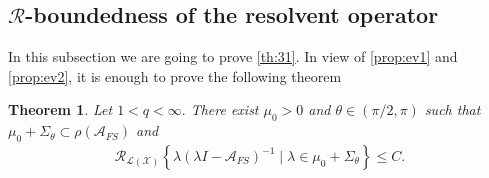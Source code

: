 \documentclass[12pt,a4paper,reqno]{amsart}
\newtheorem{theorem}{Theorem}[section]
\theoremstyle{definition}
\theoremstyle{remark}
\numberwithin{equation}{section}
\newcommand{\mx}{\mathcal{X}}
\newcommand{\mr}{\mathcal{R}}
\begin{document}
\subsection{$\mathcal{R}$-boundedness of the resolvent operator}
In this subsection we are going to prove \cref{th:31}. In view of \cref{prop:ev1} and \cref{prop:ev2}, it is enough to prove the following theorem
\begin{theorem} \label{thm:rbd-afs}
Let $1 < q < \infty.$ There exist $\mu_{0} > 0$  and $\theta \in (\pi/2, \pi)$ such that $\mu_{0} + \Sigma_{\theta} \subset \rho(\mathcal{A}_{FS})$ and 
\begin{align}
\mr_{\mathcal{L}(\mx)} \left\{ \lambda (\lambda I - \mathcal{A}_{FS})^{-1} \mid \lambda \in \mu_{0} + \Sigma_{\theta} \right\}  \leqslant C.
\end{align}
\end{theorem}
\end{document}
